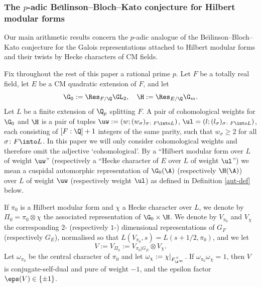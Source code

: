 \subsubsection{The $p$-adic  {Be\u\i linson}--Bloch--Kato conjecture for Hilbert modular forms}
Our main arithmetic results concern the $p$-adic analogue
of the {Be\u\i linson}--Bloch--Kato conjecture   for the Galois representations attached to Hilbert modular forms and their twists by Hecke characters of CM fields.

 Fix throughout the rest of this paper a rational prime  $p$. Let $F$ be a totally real field,  let $E$ be  a CM quadratic extension of $F$, and  let%
$$\G_{0}:= \Res_{F/\Q}\GL_{2}, \quad \H:= \Res_{E/\Q}\G_{m}.$$
  Let $L$ be a finite extension of $\Q_{p}$ splitting $F$.
A pair of cohomological weights for $\G_{0}$ and $\H$ is a pair of tuples $\uw:=(w; (w_{\sigma})_{\sigma\colon F\into L})$, $\ul=(l;(l_{\sigma})_{\sigma\colon F\into L} )$, each consisting of   $[F:\Q]+1$ integers  of the same parity, such that $w_{\sigma}\geq 2$ for all $\sigma\colon F\into L$.  In this paper we will only consider cohomological weights and therefore omit the adjective `cohomological'. By a ``Hilbert modular form over $L$ of weight $\uw$'' (respectively a  ``Hecke character of $E$ over $L$ of weight $\ul$'') we mean a cuspidal automorphic  representation of $\G_{0}(\A)$ (respectively $\H(\A)$) over $L$ of weight $\uw$ (respectively weight $\ul$) as defined in Definition \ref{aut-def} below.


If $\pi_{0}$ is a Hilbert modular form and $\chi$  a Hecke character over $L$, we denote by $\Pi_{0}=\pi_{0}\otimes \chi$ the associated representation of $\G_{0}\times \H$. We denote by  $V_{\pi_{0}}$ and $V_{\chi}$
the corresponding $2$- (respectively $1$-) dimensional representations of $G_{F}$ (respectively $G_{E}$), normalised so that $L(V_{\pi_{0}}, s)= L(s+1/2, {\pi_{0}})$,  and we let
$$V:= V_{\Pi_{0}}:=V_{\pi_{0}|G_{E}}\otimes V_{\chi}.$$
Let  $\omega_{\pi_{0}}$ be the central character of $\pi_{0}$ and let $\omega_{\chi}:=\chi|_{F_{\A^{\infty}}^{\times}}$. If $\omega_{\pi_{0}}\omega_{\chi}=1$, then $V$  is  conjugate-self-dual  and pure of weight $-1$,  and  the  epsilon factor $\eps(V)\in  \{\pm 1\}$.

